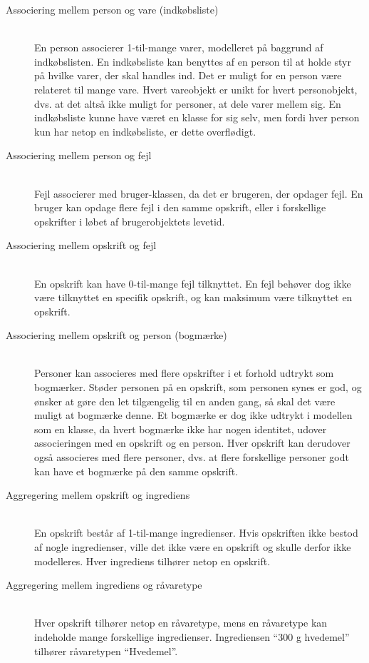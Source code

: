 \begin{description}

\item[Associering mellem person og vare (indkøbsliste)] \hfill \\
En person associerer 1-til-mange varer, modelleret på baggrund af indkøbslisten. En indkøbsliste kan benyttes af en person til at holde styr på hvilke varer, der skal handles ind.  Det er muligt for en person være relateret til mange vare. Hvert vareobjekt er unikt for hvert personobjekt, dvs. at det altså ikke muligt for personer, at dele varer mellem sig. En indkøbsliste kunne have været en klasse for sig selv, men fordi hver person kun har netop en indkøbsliste, er dette overflødigt.

\item[Associering mellem person og fejl] \hfill \\
Fejl associerer med bruger-klassen, da det er brugeren, der opdager fejl. En bruger kan opdage flere fejl i den samme opskrift, eller i forskellige opskrifter i løbet af brugerobjektets levetid.

\item[Associering mellem opskrift og fejl] \hfill \\
En opskrift kan have 0-til-mange fejl tilknyttet. En fejl behøver dog ikke være tilknyttet en specifik opskrift, og kan maksimum være tilknyttet en opskrift.

\item[Associering mellem opskrift og person (bogmærke)] \hfill \\
Personer kan associeres med flere opskrifter i et forhold udtrykt som bogmærker. Støder personen på en opskrift, som personen synes er god, og ønsker at gøre den let tilgængelig til en anden gang, så skal det være muligt at bogmærke denne. Et bogmærke er dog ikke udtrykt i modellen som en klasse, da hvert bogmærke ikke har nogen identitet, udover associeringen med en opskrift og en person. Hver opskrift kan derudover også associeres med flere personer, dvs. at flere forskellige personer godt kan have et bogmærke på den samme opskrift. 

\item[Aggregering mellem opskrift og ingrediens] \hfill \\
En opskrift består af 1-til-mange ingredienser. Hvis opskriften ikke bestod af nogle ingredienser, ville det ikke være en opskrift og skulle derfor ikke modelleres. Hver ingrediens tilhører netop en opskrift.

\item[Aggregering mellem ingrediens og råvaretype] \hfill \\
Hver opskrift tilhører netop en råvaretype, mens en råvaretype kan indeholde mange forskellige ingredienser. Ingrediensen ``300 g hvedemel'' tilhører \fx råvaretypen ``Hvedemel''.

\end{description}

